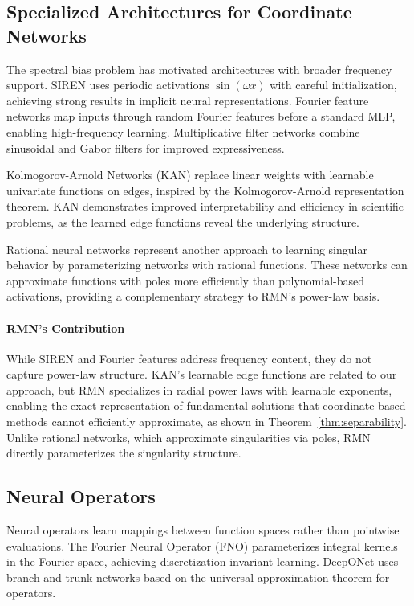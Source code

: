 \documentclass[twoside,11pt]{article}
\begin{document}
\subsection{Specialized Architectures for Coordinate Networks}

The spectral bias problem has motivated architectures with broader frequency support. SIREN \citep{sitzmann2020siren} uses periodic activations $\sin(\omega x)$ with careful initialization, achieving strong results in implicit neural representations. Fourier feature networks \citep{tancik2020fourier} map inputs through random Fourier features before a standard MLP, enabling high-frequency learning. Multiplicative filter networks \citep{fathony2021multiplicative} combine sinusoidal and Gabor filters for improved expressiveness.

Kolmogorov-Arnold Networks (KAN) \citep{liu2024kan, liu2024kan2} replace linear weights with learnable univariate functions on edges, inspired by the Kolmogorov-Arnold representation theorem. KAN demonstrates improved interpretability and efficiency in scientific problems, as the learned edge functions reveal the underlying structure.

Rational neural networks \citep{boulle2020rational, boulle2022data} represent another approach to learning singular behavior by parameterizing networks with rational functions. These networks can approximate functions with poles more efficiently than polynomial-based activations, providing a complementary strategy to RMN's power-law basis.

\paragraph{RMN's Contribution} While SIREN and Fourier features address frequency content, they do not capture power-law structure. KAN's learnable edge functions are related to our approach, but RMN specializes in radial power laws with learnable exponents, enabling the exact representation of fundamental solutions that coordinate-based methods cannot efficiently approximate, as shown in Theorem~\ref{thm:separability}. Unlike rational networks, which approximate singularities via poles, RMN directly parameterizes the singularity structure.

\subsection{Neural Operators}

Neural operators learn mappings between function spaces rather than pointwise evaluations. The Fourier Neural Operator (FNO) \citep{li2020fourier} parameterizes integral kernels in the Fourier space, achieving discretization-invariant learning. DeepONet \citep{lu2021learning} uses branch and trunk networks based on the universal approximation theorem for operators.
\end{document}
